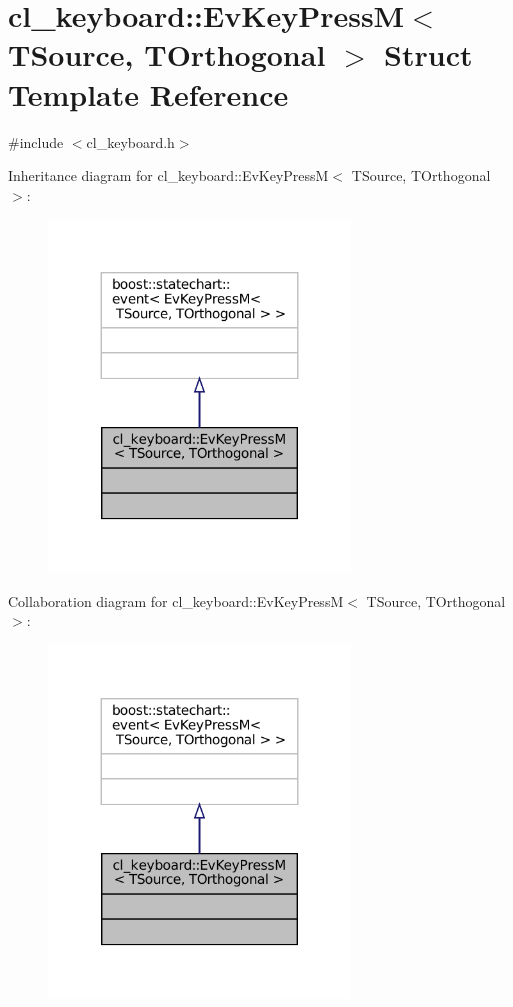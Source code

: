 \hypertarget{structcl__keyboard_1_1EvKeyPressM}{}\section{cl\+\_\+keyboard\+:\+:Ev\+Key\+PressM$<$ T\+Source, T\+Orthogonal $>$ Struct Template Reference}
\label{structcl__keyboard_1_1EvKeyPressM}


{\ttfamily \#include $<$cl\+\_\+keyboard.\+h$>$}



Inheritance diagram for cl\+\_\+keyboard\+:\+:Ev\+Key\+PressM$<$ T\+Source, T\+Orthogonal $>$\+:
\nopagebreak
\begin{figure}[H]
\begin{center}
\leavevmode
\includegraphics[width=227pt]{structcl__keyboard_1_1EvKeyPressM__inherit__graph}
\end{center}
\end{figure}


Collaboration diagram for cl\+\_\+keyboard\+:\+:Ev\+Key\+PressM$<$ T\+Source, T\+Orthogonal $>$\+:
\nopagebreak
\begin{figure}[H]
\begin{center}
\leavevmode
\includegraphics[width=227pt]{structcl__keyboard_1_1EvKeyPressM__coll__graph}
\end{center}
\end{figure}


